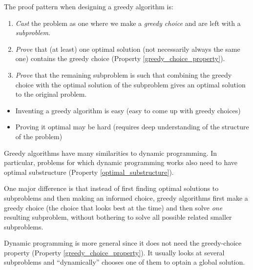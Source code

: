 The proof pattern when designing a greedy algorithm is:
\begin{enumerate}[partopsep=0em, topsep=0em, label=(\roman*)]
  \item \emph{Cast} the problem as one where we make a \emph{greedy choice} and are left with a \emph{subproblem}. \label{greedy_design_step:cast}
  \item \emph{Prove} that (at least) one optimal solution (not necessarily always the same one) contains the greedy choice (Property \ref{greedy_choice_property}).
  \item \emph{Prove} that the remaining subproblem is such that combining the greedy choice with the optimal solution of the subproblem gives an optimal solution to the original problem.%
\end{enumerate}

\begin{remark}\label{rem:designing_greedy_algorithms}
\leavevmode
\begin{itemize}
  \item Inventing a greedy algorithm is easy (easy to come up with greedy choices)
  \item Proving it optimal may be hard (requires deep understanding of the structure of the problem)
  \qedhere
\end{itemize}
\end{remark}


\begin{remark}\label{rem:greedy_vs_dp}
Greedy algorithms have many similarities to dynamic programming. 
In particular, problems for which dynamic programming works also need to have optimal substructure (Property \ref{optimal_substructure}).

One major difference is that instead of first finding optimal solutions to subproblems and then making an informed choice, greedy algorithms first make a greedy choice (the choice that looks best at the time) and then solve \emph{one} resulting subproblem, without bothering to solve all possible related smaller subproblems.

Dynamic programming is more general since it does not need the greedy-choice property (Property \ref{greedy_choice_property}).
It usually looks at several subproblems and ``dynamically'' chooses one of them to optain a global solution.
\end{remark}


